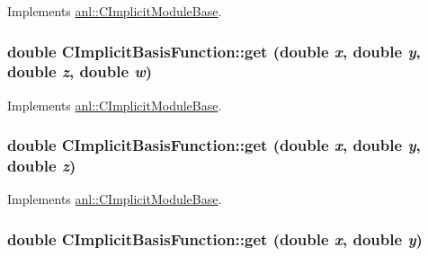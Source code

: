 Implements \hyperlink{classanl_1_1CImplicitModuleBase_aa40b7d54572197612a4fea44b63447eb}{anl::CImplicitModuleBase}.\hypertarget{classanl_1_1CImplicitBasisFunction_a5dab3e931e2bffd223301ada4e9080ef}{
\subsubsection[{get}]{\setlength{\rightskip}{0pt plus 5cm}double CImplicitBasisFunction::get (double {\em x}, \/  double {\em y}, \/  double {\em z}, \/  double {\em w})}}
\label{classanl_1_1CImplicitBasisFunction_a5dab3e931e2bffd223301ada4e9080ef}


Implements \hyperlink{classanl_1_1CImplicitModuleBase_a3cf520bdab59631864253c03b4e1723f}{anl::CImplicitModuleBase}.\hypertarget{classanl_1_1CImplicitBasisFunction_af4ae388cbc87477600c5d24c2450366b}{
\subsubsection[{get}]{\setlength{\rightskip}{0pt plus 5cm}double CImplicitBasisFunction::get (double {\em x}, \/  double {\em y}, \/  double {\em z})}}
\label{classanl_1_1CImplicitBasisFunction_af4ae388cbc87477600c5d24c2450366b}


Implements \hyperlink{classanl_1_1CImplicitModuleBase_ac17d592612c82ba3d47f9229a00b1fe3}{anl::CImplicitModuleBase}.\hypertarget{classanl_1_1CImplicitBasisFunction_a78231e212255d16f3c99edd7107ae2da}{
\subsubsection[{get}]{\setlength{\rightskip}{0pt plus 5cm}double CImplicitBasisFunction::get (double {\em x}, \/  double {\em y})}}
\label{classanl_1_1CImplicitBasisFunction_a78231e212255d16f3c99edd7107ae2da}


